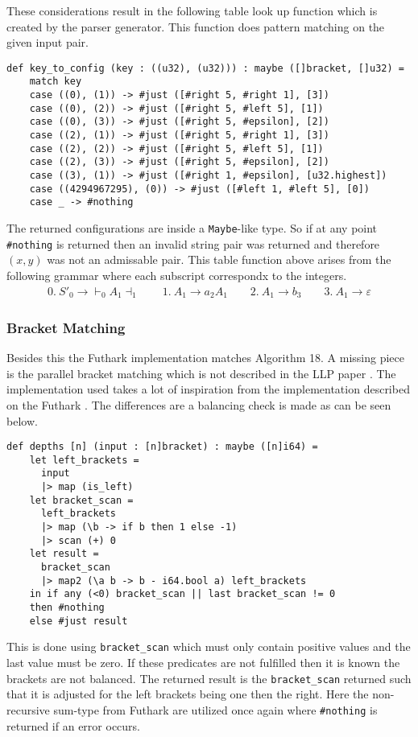 These considerations result in the following table look up function which is created by the parser generator. This function does pattern matching on the given input pair.

\begin{lstlisting}[basicstyle=\ttfamily\scriptsize]
def key_to_config (key : ((u32), (u32))) : maybe ([]bracket, []u32) =
    match key
    case ((0), (1)) -> #just ([#right 5, #right 1], [3])
    case ((0), (2)) -> #just ([#right 5, #left 5], [1])
    case ((0), (3)) -> #just ([#right 5, #epsilon], [2])
    case ((2), (1)) -> #just ([#right 5, #right 1], [3])
    case ((2), (2)) -> #just ([#right 5, #left 5], [1])
    case ((2), (3)) -> #just ([#right 5, #epsilon], [2])
    case ((3), (1)) -> #just ([#right 1, #epsilon], [u32.highest])
    case ((4294967295), (0)) -> #just ([#left 1, #left 5], [0])
    case _ -> #nothing
\end{lstlisting}
The returned configurations are inside a \lstinline|Maybe|-like type. So if at any point \lstinline|#nothing| is returned then an invalid string pair was returned and therefore $(x,y)$ was not an admissable pair. This table function above arises from the following grammar where each subscript correspondx to the integers.
\begin{align*}
    0. \: S'_0 \to \vdash_0 A_1 \dashv_1 \qquad 1. \: A_1 \to a_2 A_1 \qquad 2. \: A_1 \to b_3 \qquad 3. \: A_1 \to \varepsilon
\end{align*}

\subsubsection{Bracket Matching}
Besides this the Futhark implementation matches Algorithm 18. A missing piece is the parallel bracket matching which is not described in the LLP paper \cite[text]{Vagner2007}. The implementation used takes a lot of inspiration from the implementation described on the Futhark \cite{futhark:parens}. The differences are a balancing check is made as can be seen below.
\begin{lstlisting}[basicstyle=\ttfamily\scriptsize]
def depths [n] (input : [n]bracket) : maybe ([n]i64) =
    let left_brackets =
      input
      |> map (is_left)
    let bracket_scan =
      left_brackets
      |> map (\b -> if b then 1 else -1)
      |> scan (+) 0
    let result =
      bracket_scan
      |> map2 (\a b -> b - i64.bool a) left_brackets
    in if any (<0) bracket_scan || last bracket_scan != 0
    then #nothing
    else #just result
\end{lstlisting}
This is done using \lstinline|bracket_scan| which must only contain positive values and the last value must be zero. If these predicates are not fulfilled then it is known the brackets are not balanced. The returned result is the \lstinline|bracket_scan| returned such that it is adjusted for the left brackets being one then the right. Here the non-recursive sum-type from Futhark are utilized once again where \lstinline|#nothing| is returned if an error occurs.

